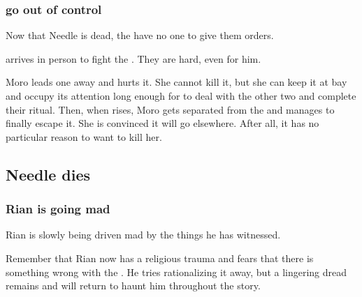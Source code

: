 \subsubsection{\Banes go out of control}
Now that Needle is dead, the \banes have no one to give them orders. 

\Psyrex arrives in person to fight the \banes. 
They are hard, even for him. 

Moro leads one \bane away and hurts it.
She cannot kill it, but she can keep it at bay and occupy its attention long enough for \Psyrex to deal with the other two \banes and complete their ritual. 
Then, when \Nithdornazsh rises, Moro gets separated from the \bane and manages to finally escape it.
She is convinced it will go elsewhere.
After all, it has no particular reason to want to kill her. 








\subsection{Needle dies}





\subsubsection{Rian is going mad}
Rian is slowly being driven mad by the things he has witnessed. 


Remember that Rian now has a religious trauma and fears that there is something wrong with the \sephiroth. 
He tries rationalizing it away, but a lingering dread remains and will return to haunt him throughout the story. 







